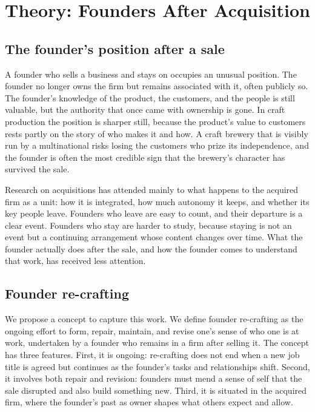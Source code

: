 \documentclass[12pt]{article}
\begin{document}
\section{Theory: Founders After Acquisition}

\subsection{The founder's position after a sale}

A founder who sells a business and stays on occupies an unusual position. The founder no longer owns the firm but remains associated with it, often publicly so. The founder's knowledge of the product, the customers, and the people is still valuable, but the authority that once came with ownership is gone. In craft production the position is sharper still, because the product's value to customers rests partly on the story of who makes it and how. A craft brewery that is visibly run by a multinational risks losing the customers who prize its independence, and the founder is often the most credible sign that the brewery's character has survived the sale.

Research on acquisitions has attended mainly to what happens to the acquired firm as a unit: how it is integrated, how much autonomy it keeps, and whether its key people leave. Founders who leave are easy to count, and their departure is a clear event. Founders who stay are harder to study, because staying is not an event but a continuing arrangement whose content changes over time. What the founder actually does after the sale, and how the founder comes to understand that work, has received less attention.

\subsection{Founder re-crafting}

We propose a concept to capture this work. We define founder re-crafting as the ongoing effort to form, repair, maintain, and revise one's sense of who one is at work, undertaken by a founder who remains in a firm after selling it. The concept has three features. First, it is ongoing: re-crafting does not end when a new job title is agreed but continues as the founder's tasks and relationships shift. Second, it involves both repair and revision: founders must mend a sense of self that the sale disrupted and also build something new. Third, it is situated in the acquired firm, where the founder's past as owner shapes what others expect and allow.
\end{document}
